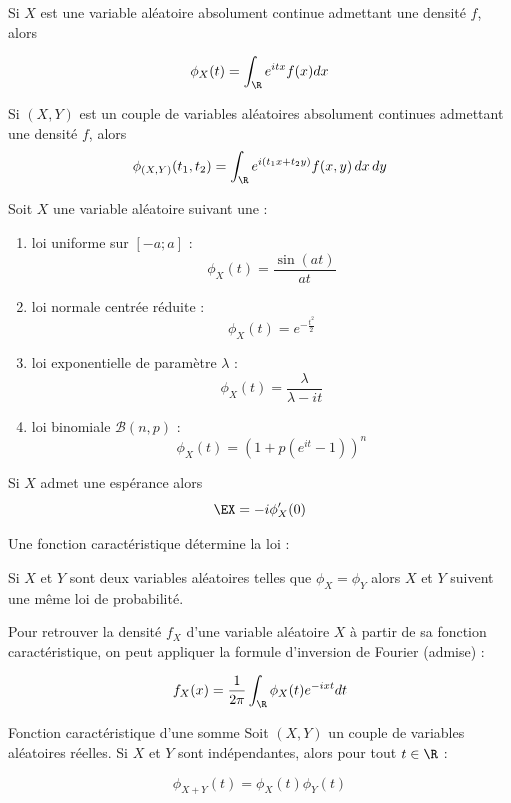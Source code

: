 			Si $X$ est une variable aléatoire absolument continue admettant une densité $f$, alors 
			
			$$\phi_{X}(t) = \int_{\R}^{} e^{i tx} f(x)dx$$
			
			Si $(X,Y)$ est un couple de variables aléatoires absolument continues admettant une densité $f$, alors 
			$$\phi_{(X,Y)}(t_1,t_2) = \int_{\R}^{} e^{i (t_1x+t_2y)} f(x,y)\,dx\,dy$$

		

		
		\begin{exemple}{}{}
			Soit $X$ une variable aléatoire suivant une :
			\begin{enumerate}
				\item loi uniforme sur $[-a;a]$ : 
				$$\phi_{X}(t) = \frac{\sin(a t)}{a t}$$
				\item loi normale centrée réduite : 
				$$\phi_{X}(t) = e^{-\frac{t^2}{2}}$$
				\item loi exponentielle de paramètre $\lambda$ :
				$$\phi_{X}(t) = \frac{\lambda}{\lambda - i t}$$
				\item loi binomiale $\mathcal{B}(n,p)$ :
				$$\phi_{X}(t) = (1+p(e^{i t}-1))^n$$
			\end{enumerate}
		\end{exemple}
		
		\begin{proposition}{}{}
			Si $X$ admet une espérance alors $$\EX = -i\phi_X'(0)$$
		\end{proposition}
		
		Une fonction caractéristique détermine la loi :
		
		\begin{proposition}{}{}
			Si $X$ et $Y$ sont deux variables aléatoires telles que $\phi_X=\phi_Y$ alors $X$ et $Y$ suivent une même loi de probabilité.
		\end{proposition}
		
		Pour retrouver la densité $f_X$ d'une variable aléatoire $X$ à partir de sa fonction caractéristique, on peut appliquer la formule d'inversion de Fourier (admise) :

		$$ f_{X}(x)  = \displaystyle \frac{1}{2\pi} \int_{\R} \phi_{X}(t) e^{-i xt} dt $$
		
		\begin{proposition}{Fonction caractéristique d'une somme}{}
			Soit  $(X,Y)$ un couple de variables aléatoires réelles. Si $X$ et $Y$ sont indépendantes, alors pour tout $t \in \R $ :
			
			
			$$ \phi_{X+Y}(t)=\phi_X(t)\phi_Y(t)$$
			
		\end{proposition}
	
